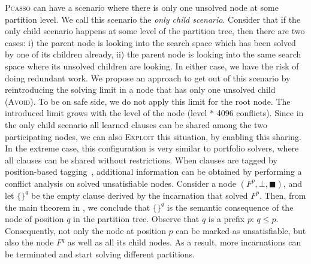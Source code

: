 \documentclass[conference]{IEEEtran}
\renewcommand{\langle}{\{}
\renewcommand{\rangle}{\}}
\newcommand{\1}{x_1}
\newcommand{\2}{x_2}
\newcommand{\3}{x_3}
\newcommand{\4}{x_4}
\newcommand{\5}{x_5}
\newcommand{\6}{x_6}
\newcommand{\7}{x_7}
\newcommand{\8}{x_8}
\newcommand{\9}{x_9}
\newcommand{\pcasso}{\textsc{Pcasso}\xspace}
\begin{document}
\pcasso can have a scenario where there is only one unsolved node at some partition level.
We call this scenario the \emph{only child scenario}. 
%
%
%
%
Consider that if the only child scenario happens at some level of the partition tree, then there are two cases:
i) the parent node is looking into the search space which has been solved by one of its children already,
ii) the parent node is looking into the same search space where its unsolved children are looking.
In either case, we have the risk of doing redundant work.
We propose an approach to get out of this scenario by reintroducing the solving limit in a node that has only one unsolved child (\textsc{Avoid}).
To be on safe side, we do not apply this limit for the root node. %
The introduced limit grows with the level of the node (level $*$ 4096 conflicts). 
Since in the only child scenario all learned clauses can be shared among the two participating nodes, we can also \textsc{Exploit} this situation, by enabling this sharing. 
In the extreme case, this configuration is very similar to portfolio solvers, where all clauses can be shared without restrictions. 
%
When clauses are tagged by position-based tagging~\cite{davide}, additional information can be obtained by performing a conflict analysis on solved unsatisfiable nodes. Consider a node $(F^p, \bot, \blacksquare)$, and let $\langle \rangle^q$ be the empty clause derived by the incarnation that solved $F^p$. Then, from the main theorem in \cite{davide}, we conclude that $\langle \rangle^q$ is the semantic consequence of the node of position $q$ in the partition tree. Observe that $q$ is a prefix $p$: $q \le p$. Consequently, not only the node at position $p$ can be marked as unsatisfiable, but also the node $F^q$ as well as all its child nodes. As a result, more incarnations can be terminated and start solving different partitions. 
\end{document}

